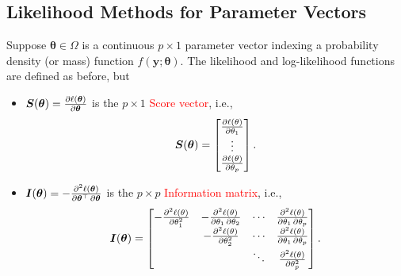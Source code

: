 \documentclass{article}\usepackage[]{graphicx}\usepackage[svgnames]{xcolor}
\providecommand{\Vector}[1]{\bm{#1}}%
\providecommand{\Matrix}[1]{\bm{#1}}
\begin{document}
\subsection*{Likelihood Methods for Parameter Vectors}
Suppose $ \Vector{\theta}\in \Omega $ is a continuous $ p\times 1 $ parameter vector
indexing a probability density (or mass) function $ f(\Vector{y};\Vector{\theta}) $. The likelihood and
log-likelihood functions are defined as before, but
\begin{itemize}
      \item $ \Vector{S}(\Vector{\theta})=\pdv{\ell( \Vector{\theta})}{ \Vector{\theta}} $ is the $ p\times 1 $ \textcolor{Red}{Score vector}, i.e.,
            \[ \Vector{S}(\Vector{\theta})=\begin{bmatrix}
                        \pdv{\ell(\theta)}{\theta_1} \\
                        \vdots                       \\
                        \pdv{\ell(\theta)}{\theta_p}
                  \end{bmatrix}. \]
      \item $ \Matrix{I}(\Vector{\theta})=-\pdv{\ell(\Vector{\theta})}{ \Vector{\theta}^\top,\Vector{\theta}} $ is the $ p\times p $ \textcolor{Red}{Information matrix}, i.e.,
            \[ \Matrix{I}(\Vector{\theta})=\begin{bmatrix}
                        -\pdv[order=2]{\ell(\theta)}{\theta_1} & -\pdv{\ell(\theta)}{\theta_1,\theta_2} & \cdots & \pdv{\ell(\theta)}{\theta_1,\theta_p} \\
                                                               & -\pdv[order=2]{\ell(\theta)}{\theta_2} & \cdots & \pdv{\ell(\theta)}{\theta_1,\theta_p} \\
                                                               &                                        & \ddots & \pdv[order=2]{\ell(\theta)}{\theta_p}
                  \end{bmatrix}. \]

\end{itemize}
\end{document}

